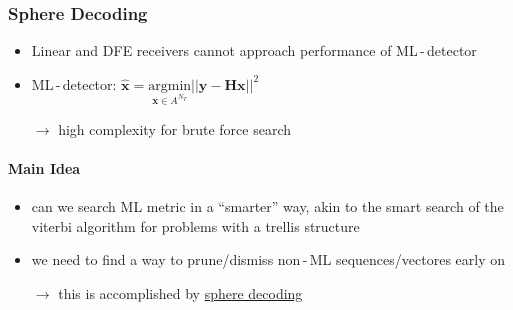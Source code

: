 \documentclass[a4paper, 10pt]{article}
\begin{document}
\subsubsection{Sphere Decoding}

\begin{itemize}
	\item Linear and DFE receivers cannot approach performance of ML\,-\,detector
	\item ML\,-\,detector: $ \hat{\mathbf{x}} = \underset{\mathbf{x} \in A^{N_T}}{\text{argmin}}||\mathbf{y} - \mathbf{Hx}||^2 $
	\item[$\rightarrow$] high complexity for brute force search
\end{itemize}
\paragraph{Main Idea}
\begin{itemize}
	\item can we search ML metric in a ``smarter'' way, akin to the smart search of the viterbi algorithm for problems with a trellis structure
	\item we need to find a way to prune/dismiss non\,-\,ML sequences/vectores early on
	\item[$\rightarrow$] this is accomplished by \underline{sphere decoding}	
\end{itemize}
\end{document}
